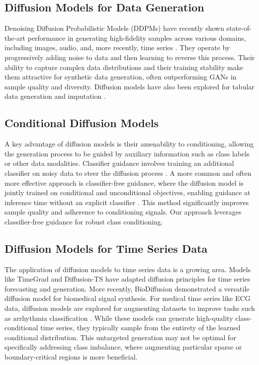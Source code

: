 \documentclass{article}
\begin{document}
\subsection{Diffusion Models for Data Generation}
Denoising Diffusion Probabilistic Models (DDPMs) \cite{Ho_2020_DDPM, Sohl_Dickstein_2015_Diffusion} have recently shown state-of-the-art performance in generating high-fidelity samples across various domains, including images, audio, and, more recently, time series \cite{li2024biodiffusion}. They operate by progressively adding noise to data and then learning to reverse this process. Their ability to capture complex data distributions and their training stability make them attractive for synthetic data generation, often outperforming GANs in sample quality and diversity. Diffusion models have also been explored for tabular data generation and imputation \cite{kotelnikov2023tabddpm}.

\subsection{Conditional Diffusion Models}
A key advantage of diffusion models is their amenability to conditioning, allowing the generation process to be guided by auxiliary information such as class labels or other data modalities. Classifier guidance involves training an additional classifier on noisy data to steer the diffusion process \cite{Dhariwal_Nichol_2021_ClassifierGuidance}. A more common and often more effective approach is classifier-free guidance, where the diffusion model is jointly trained on conditional and unconditional objectives, enabling guidance at inference time without an explicit classifier \cite{Ho_Salimans_2022_ClassifierFree}. This method significantly improves sample quality and adherence to conditioning signals. Our approach leverages classifier-free guidance for robust class conditioning.

\subsection{Diffusion Models for Time Series Data}
The application of diffusion models to time series data is a growing area. Models like TimeGrad \cite{rasul2021autoregressive} and Diffusion-TS \cite{Gong_2023_DiffusionTS} have adapted diffusion principles for time series forecasting and generation. More recently, BioDiffusion \cite{li2024biodiffusion} demonstrated a versatile diffusion model for biomedical signal synthesis. For medical time series like ECG data, diffusion models are explored for augmenting datasets to improve tasks such as arrhythmia classification \cite{adib2023synthetic}. While these models can generate high-quality class-conditional time series, they typically sample from the entirety of the learned conditional distribution. This untargeted generation may not be optimal for specifically addressing class imbalance, where augmenting particular sparse or boundary-critical regions is more beneficial.
\end{document}
